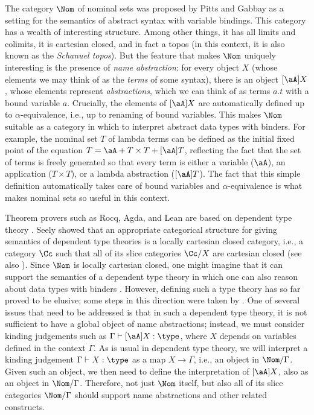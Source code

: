 \documentclass[twoside,11pt]{entics}
\begin{document}
The category $\Nom$ of nominal sets was proposed by Pitts and Gabbay
{\cite{GabbayPitts1999,GabbayPitts2002}} as a setting for the semantics of abstract
syntax with variable bindings. This category has a wealth of
interesting structure. Among other things, it has all limits and
colimits, it is cartesian closed, and in fact a topos (in this
context, it is also known as the \emph{Schanuel topos}). But the
feature that makes $\Nom$ uniquely interesting is the presence of
\emph{name abstraction}: for every object $X$ (whose elements we may
think of as the \emph{terms} of some syntax), there is an object
$[\aA]X$, whose elements represent \emph{abstractions}, which we can
think of as terms $a.t$ with a bound variable $a$. Crucially, the
elements of $[\aA]X$ are automatically defined up to
$\alpha$-equivalence, i.e., up to renaming of bound variables. This
makes $\Nom$ suitable as a category in which to interpret abstract
data types with binders. For example, the nominal set $T$ of lambda terms can be defined as the initial fixed point of
the equation $T = \aA + T\times T + [\aA]T$, reflecting the fact that
the set of terms is freely generated so that every term is either a
variable ($\aA$), an application ($T\times T$), or a lambda
abstraction ($[\aA]T$). The fact that this simple definition
automatically takes care of bound variables and $\alpha$-equivalence
is what makes nominal sets so useful in this context.

Theorem provers such as Rocq, Agda, and Lean are based on dependent
type theory {\cite{rocq,agda,lean}}. Seely showed that an appropriate
categorical structure for giving semantics of dependent type theories
is a locally cartesian closed category, i.e., a category $\Cc$ such
that all of its slice categories $\Cc/X$ are cartesian closed
{\cite{Seely1984}} (see also \cite{Clairambault2014}).  Since $\Nom$
is locally cartesian closed, one might imagine that it can support the
semantics of a dependent type theory in which one can also reason
about data types with binders \cite{Pitts2013}. However, defining such
a type theory has so far proved to be elusive; some steps in this
direction were taken by
{\cite{Cheney2012,Pitts2015,Fairweather_et_al2015,VanMuylder_et_al2025}}. One
of several issues that need to be addressed is that in such a
dependent type theory, it is not sufficient to have a global object of
name abstractions; instead, we must consider kinding judgements such
as $\Gamma\vdash [\aA]X : \type$, where $X$ depends on variables
defined in the context $\Gamma$.  As is usual in dependent type
theory, we will interpret a kinding judgement $\Gamma \vdash X :
\type$ as a map $X\to\Gamma$, i.e., an object in $\Nom/\Gamma$. Given
such an object, we then need to define the interpretation of $[\aA]X$,
also as an object in $\Nom/\Gamma$.  Therefore, not just $\Nom$
itself, but also all of its slice categories $\Nom/\Gamma$ should
support name abstractions and other related constructs.
\end{document}
